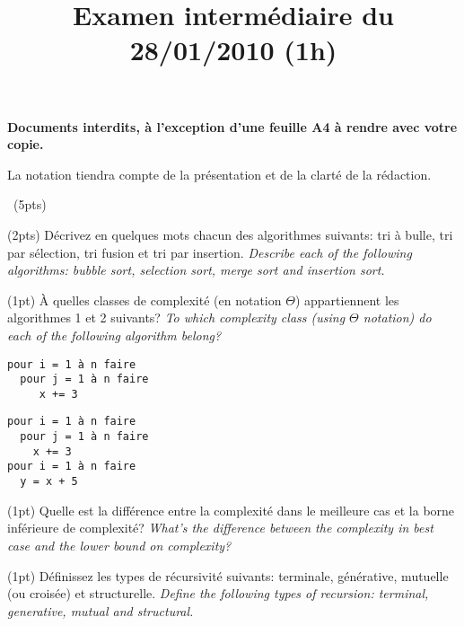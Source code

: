 \documentclass[10pt]{article}\usepackage[nu]{esial}
\begin{document}
\title{Examen intermédiaire du 28/01/2010 (1h)}
\maketitle

\begin{centering}
  \textbf{\large Documents interdits, à l'exception d'une feuille A4 à rendre
    avec votre copie.}

\end{centering}
\centerline{La notation tiendra compte de la présentation et de la clarté de
  la rédaction.}
\bigskip





\bigskip\QuestionCours~(5pts)

\Question(2pts) Décrivez en quelques mots  chacun des algorithmes suivants: tri à
bulle, tri par sélection, tri fusion et tri par insertion.
%
\textit{Describe each of the following algorithms: bubble sort, selection sort,
merge sort and insertion sort.} 

\Question(1pt) À quelles classes de complexité (en notation
$\Theta$) appartiennent les algorithmes 1 et 2 suivants?
%
\textit{To which complexity class (using $\Theta$ notation) do each of the
  following algorithm belong?}

\medskip\noindent\begin{minipage}{.45\linewidth}
  \begin{Verbatim}[label=algorithme 1]
pour i = 1 à n faire
  pour j = 1 à n faire
     x += 3    
  \end{Verbatim}
\end{minipage}\hfill\begin{minipage}{.45\linewidth}
  \begin{Verbatim}[label=algorithme 2]
pour i = 1 à n faire
  pour j = 1 à n faire
    x += 3
pour i = 1 à n faire
  y = x + 5
  \end{Verbatim}
\end{minipage}

\Question(1pt) Quelle est la différence entre la complexité dans le meilleure cas et
la borne inférieure de complexité? \textit{What's the difference between the
  complexity in best case and the lower bound on complexity?}

\Question(1pt) Définissez les types de récursivité suivants: terminale,
générative, mutuelle (ou croisée) et structurelle. \textit{Define the following
types of recursion: terminal, generative, mutual and structural.}
\end{document}
